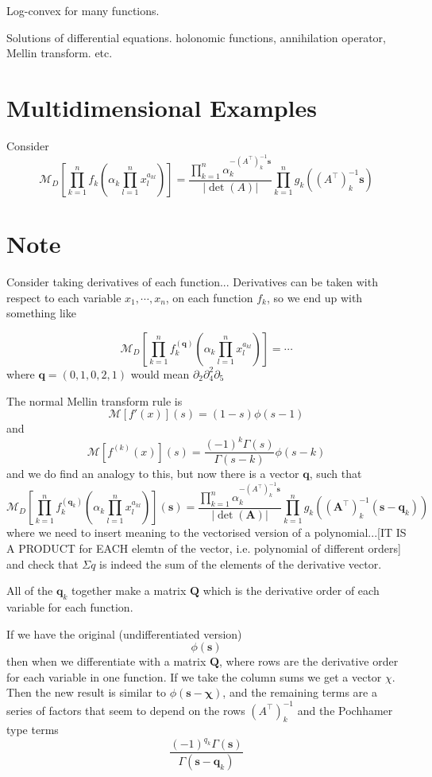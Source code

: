 \documentclass{article}
\begin{document}
Log-convex for many functions.

Solutions of differential equations. holonomic functions, annihilation operator, Mellin transform. etc.

\section{Multidimensional Examples}
Consider
$$
\mathcal{M}_D\left[\prod_{k=1}^n f_k \left(\alpha_k \prod_{l=1}^n x_l^{a_{kl}}\right) \right]=\frac{\prod_{k=1}^n \alpha_k^{-(A^\top)_k^{-1} \mathbf{s}}}{|\det(A)|} \prod_{k=1}^n g_k((A^\top)_k^{-1} \mathbf{s})
$$

\section{Note}
Consider taking derivatives of each function...
Derivatives can be taken with respect to each variable $x_1, \cdots, x_n$, on each function $f_k$, so we end up with something like

$$
\mathcal{M}_D\left[\prod_{k=1}^n f^{(\mathbf{q})}_k \left(\alpha_k \prod_{l=1}^n x_l^{a_{kl}}\right) \right]= \cdots
$$
where $\mathbf{q} = (0,1,0,2,1)$ would mean $\partial_2 \partial_4^2 \partial_5$

The normal Mellin transform rule is 
$$
\mathcal{M}[f'(x)](s) = (1-s)\phi(s-1)
$$
and
$$
\mathcal{M}[f^{(k)}(x)](s) = \frac{(-1)^k \Gamma(s)}{\Gamma(s-k)}\phi(s-k)
$$
and we do find an analogy to this, but now there is a vector $\mathbf{q}$, such that
$$
\mathcal{M}_D\left[\prod_{k=1}^n f^{(\mathbf{q}_k)}_k \left(\alpha_k \prod_{l=1}^n x_l^{a_{kl}}\right) \right](\mathbf{s})= \frac{\prod_{k=1}^n \alpha_k^{-(A^\top)_k^{-1} \mathbf{s}}}{|\det(\mathbf{A})|} \prod_{k=1}^n  g_k((\mathbf{A}^\top)_k^{-1} (\mathbf{s-q}_k))
$$
where we need to insert meaning to the vectorised version of a polynomial...[IT IS A PRODUCT for EACH elemtn of the vector, i.e. polynomial of different orders] and check that $\Sigma q$ is indeed the sum of the elements of the derivative vector.

All of the $\mathbf{q}_k$ together make a matrix $\mathbf{Q}$ which is the derivative order of each variable for each function.

If we have the original (undifferentiated version)
$$
\phi(\mathbf{s})
$$
then when we differentiate with a matrix $\mathbf{Q}$, where rows are the derivative order for each variable in one function. If we take the column sums we get a vector $\chi$. Then the new result is similar to $\phi(\mathbf{s-\chi})$, and the remaining terms are a series of factors that seem to depend on the rows $(A^\top)_k^{-1}$ and the Pochhamer type terms 
$$
\frac{(-1)^{q_k}\Gamma(\mathbf{s})}{\Gamma(\mathbf{s-q}_k)}
$$
\end{document}
